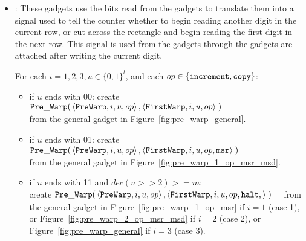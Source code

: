     \begin{itemize}

        \item {\prewarp}: These gadgets use the bits read from the {\cread} gadgets to translate them into
                          a signal used to tell the counter whether to begin reading
                          another digit in the current row, or cut across the rectangle and begin reading the
                          first digit in the next row. This signal is used from the {\prewarp} gadgets through
                          the {\dtop} gadgets are attached after writing the current digit.

            For each $i = 1,2,3, u \in \{0, 1\}^l$, and each $op \in \{ {\tt increment, copy } \}$:
            \begin{itemize}


            \item if $u$ ends with 00:
            create
            $\begin{aligned}[t]
                {\tt Pre\_Warp}(& \left\langle {\tt PreWarp},   i, u, op \right\rangle,
                           \left\langle {\tt FirstWarp}, i, u, op \right\rangle \;)
            \end{aligned}$ \\ from the general gadget in Figure~\ref{fig:pre_warp_general}.

            \item if $u$ ends with 01:
            create
            $\begin{aligned}[t]
                {\tt Pre\_Warp}(& \left\langle {\tt PreWarp},   i, u, op \right\rangle,
                           \left\langle {\tt FirstWarp}, i, u, op, {\tt msr} \right\rangle \;)
            \end{aligned}$ \\ from the general gadget in Figure~\ref{fig:pre_warp_1_op_msr_msd}.


            \item if $u$ ends with 11 and $dec(u >> 2) >= m$:\\
            create
            $\begin{aligned}[t]
                {\tt Pre\_Warp}(& \left\langle {\tt PreWarp},   i, u, op \right\rangle,
                \left\langle {\tt FirstWarp}, i, u, op, {\tt halt},  \right\rangle \;)
            \end{aligned}$ from the general gadget in Figure~\ref{fig:pre_warp_1_op_msr} if $i = 1$ (case 1),
            or Figure~\ref{fig:pre_warp_2_op_msr_msd} if $i = 2$ (case 2), or Figure~\ref{fig:pre_warp_general} if $i = 3$ (case 3).



\end{itemize}
\end{itemize}

